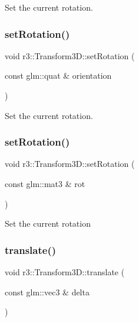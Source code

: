 Set the current rotation. \mbox{\label{classr3_1_1_transform3_d_af539b9a5a73f5196515f9a55ee73be4d}} 
\subsubsection{\texorpdfstring{set\+Rotation()}{setRotation()}\hspace{0.1cm}{\footnotesize\ttfamily [2/3]}}
{\footnotesize\ttfamily void r3\+::\+Transform3\+D\+::set\+Rotation (\begin{DoxyParamCaption}\item[{const glm\+::quat \&}]{orientation }\end{DoxyParamCaption})}

Set the current rotation. \mbox{\label{classr3_1_1_transform3_d_acaab6048f44805ef28fdae452f0c4853}} 
\subsubsection{\texorpdfstring{set\+Rotation()}{setRotation()}\hspace{0.1cm}{\footnotesize\ttfamily [3/3]}}
{\footnotesize\ttfamily void r3\+::\+Transform3\+D\+::set\+Rotation (\begin{DoxyParamCaption}\item[{const glm\+::mat3 \&}]{rot }\end{DoxyParamCaption})}

Set the current rotation \mbox{\label{classr3_1_1_transform3_d_a36ca89f7424b3efec3f2d5532c37f457}} 
\subsubsection{\texorpdfstring{translate()}{translate()}\hspace{0.1cm}{\footnotesize\ttfamily [1/2]}}
{\footnotesize\ttfamily void r3\+::\+Transform3\+D\+::translate (\begin{DoxyParamCaption}\item[{const glm\+::vec3 \&}]{delta }\end{DoxyParamCaption})}

